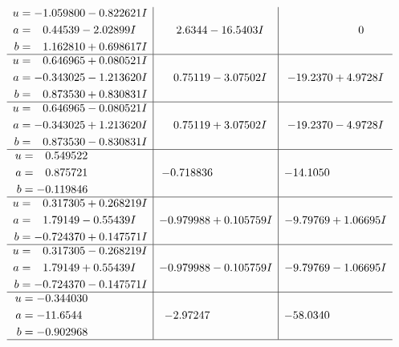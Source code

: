 \documentclass[1p]{elsarticle_modified}
\theoremstyle{definition}
\begin{document}
$$\begin{array}{c|c|c}
\begin{aligned}
u &= -1.059800 - 0.822621 I \\
a &= \phantom{-}0.44539 - 2.02899 I \\
b &= \phantom{-}1.162810 + 0.698617 I\end{aligned}
 & \phantom{-}2.6344 - 16.5403 I & \phantom{-0.000000 } 0 \\ \hline\begin{aligned}
u &= \phantom{-}0.646965 + 0.080521 I \\
a &= -0.343025 - 1.213620 I \\
b &= \phantom{-}0.873530 + 0.830831 I\end{aligned}
 & \phantom{-}0.75119 - 3.07502 I & -19.2370 + 4.9728 I \\ \hline\begin{aligned}
u &= \phantom{-}0.646965 - 0.080521 I \\
a &= -0.343025 + 1.213620 I \\
b &= \phantom{-}0.873530 - 0.830831 I\end{aligned}
 & \phantom{-}0.75119 + 3.07502 I & -19.2370 - 4.9728 I \\ \hline\begin{aligned}
u &= \phantom{-}0.549522\phantom{ +0.000000I} \\
a &= \phantom{-}0.875721\phantom{ +0.000000I} \\
b &= -0.119846\phantom{ +0.000000I}\end{aligned}
 & -0.718836\phantom{ +0.000000I} & -14.1050\phantom{ +0.000000I} \\ \hline\begin{aligned}
u &= \phantom{-}0.317305 + 0.268219 I \\
a &= \phantom{-}1.79149 - 0.55439 I \\
b &= -0.724370 + 0.147571 I\end{aligned}
 & -0.979988 + 0.105759 I & -9.79769 + 1.06695 I \\ \hline\begin{aligned}
u &= \phantom{-}0.317305 - 0.268219 I \\
a &= \phantom{-}1.79149 + 0.55439 I \\
b &= -0.724370 - 0.147571 I\end{aligned}
 & -0.979988 - 0.105759 I & -9.79769 - 1.06695 I \\ \hline\begin{aligned}
u &= -0.344030\phantom{ +0.000000I} \\
a &= -11.6544\phantom{ +0.000000I} \\
b &= -0.902968\phantom{ +0.000000I}\end{aligned}
 & -2.97247\phantom{ +0.000000I} & -58.0340\phantom{ +0.000000I}\\
 \hline 
 \end{array}$$\newpage\newpage\renewcommand{\arraystretch}{1}
\end{document}
